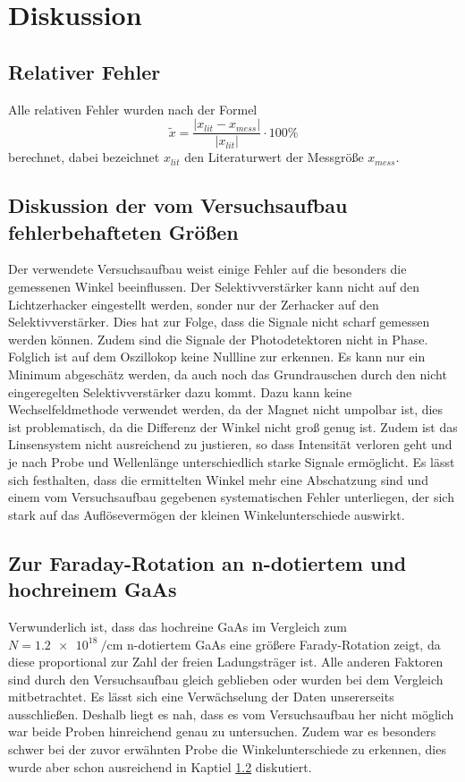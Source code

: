 \section{Diskussion}
\label{sec:Diskussion}
\subsection{Relativer Fehler}
Alle relativen Fehler wurden nach der Formel
\begin{equation*}
  \tilde{x} = \frac{ \lvert x_{lit} - x_{mess} \rvert}{\lvert x_{lit} \rvert}
  \cdot 100 \%
\end{equation*}
berechnet, dabei bezeichnet $x_{lit}$ den Literaturwert der Messgröße $x_{mess}$.

\subsection{Diskussion der vom Versuchsaufbau fehlerbehafteten Größen}
\label{sec:Fehler}
Der verwendete Versuchsaufbau weist einige Fehler auf die besonders die gemessenen Winkel 
beeinflussen. Der Selektivverstärker kann nicht auf den Lichtzerhacker eingestellt 
werden, sonder nur der Zerhacker auf den Selektivverstärker. Dies hat zur Folge, dass die Signale 
nicht scharf gemessen werden können. Zudem sind die Signale der 
Photodetektoren nicht in Phase. Folglich ist auf dem Oszillokop keine Nullline zur erkennen. Es kann 
nur ein Minimum abgeschätz werden, da auch noch das Grundrauschen durch den nicht 
eingeregelten Selektivverstärker dazu kommt. Dazu kann keine Wechselfeldmethode verwendet werden, da 
der Magnet nicht umpolbar ist, dies ist problematisch, da die Differenz der Winkel nicht groß genug ist. 
Zudem ist das Linsensystem nicht ausreichend zu justieren, so dass Intensität verloren geht 
und je nach Probe und Wellenlänge unterschiedlich starke Signale ermöglicht. 
Es lässt sich festhalten, dass die ermittelten Winkel mehr eine Abschatzung sind und einem vom 
Versuchsaufbau gegebenen systematischen Fehler unterliegen, der sich stark auf das Auflösevermögen 
der kleinen Winkelunterschiede auswirkt.

\subsection{Zur Faraday-Rotation an n-dotiertem und hochreinem GaAs}
Verwunderlich ist, dass das hochreine GaAs im Vergleich zum $N= \SI{1.2e18}{\per\centi\meter}$ 
n-dotiertem GaAs eine größere Farady-Rotation zeigt, da diese 
proportional zur Zahl der freien Ladungsträger ist. Alle anderen Faktoren sind durch den 
Versuchsaufbau gleich geblieben oder wurden bei dem Vergleich mitbetrachtet. Es lässt sich eine 
Verwächselung der Daten unsererseits ausschließen. Deshalb liegt es nah, dass es vom Versuchsaufbau 
her nicht möglich war beide Proben hinreichend genau zu untersuchen. Zudem war es besonders schwer 
bei der zuvor erwähnten Probe die Winkelunterschiede zu erkennen, dies wurde aber schon ausreichend in Kaptiel \ref{sec:Fehler} diskutiert.

